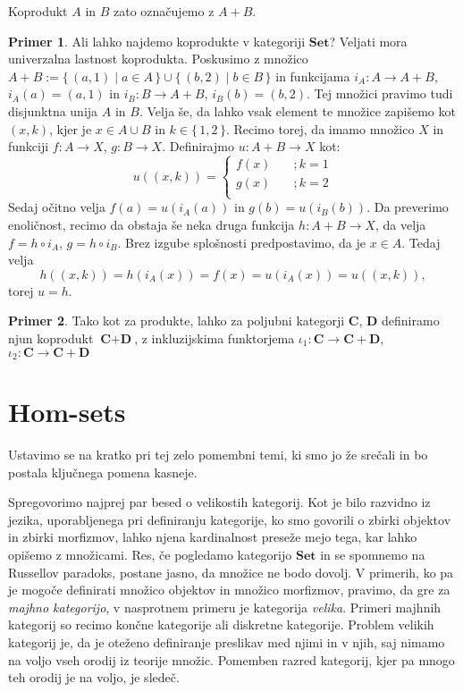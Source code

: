 \documentclass[12pt,a4paper]{book}
\theoremstyle{definition}
\theoremstyle{plain}
\theoremstyle{definition}
\newtheorem{primer}{Primer}[section]
\theoremstyle{remark}
\newcommand{\cat}[1]{\textbf{#1}}
\renewcommand{\set}[1]{\{\,#1\,\}}
\begin{document}
Koprodukt $A$ in $B$ zato označujemo z $A + B$.
\begin{primer}
Ali lahko najdemo koprodukte v kategoriji $\cat{Set}$? 
Veljati mora univerzalna lastnost koprodukta.
Poskusimo z množico $A+B := \set{(a,1) \mid a \in A} \cup \set{(b,2) \mid b \in B}$ in funkcijama $i_A : A \to A + B$, $i_A(a) = (a,1)$ in $i_B : B \to A+B$, $i_B(b) = (b,2)$. Tej množici pravimo tudi disjunktna unija $A$ in $B$. Velja še, da lahko vsak element te množice zapišemo kot $(x,k)$, kjer je $x \in A \cup B$ in $k \in \set{1,2}$. Recimo torej, da imamo množico $X$ in funkciji $f : A \to X$, $g: B \to X$. Definirajmo $u: A+B \to X$ kot:
\[
u((x,k)) = 
	\begin{cases}
		f(x) &\quad ;k = 1 \\
		g(x) &\quad ;k = 2 \\
	\end{cases}
\]
Sedaj očitno velja $f(a) = u(i_A(a))$ in $g(b) = u(i_B(b))$. Da preverimo enoličnost, recimo da obstaja še neka druga funkcija $h : A+B \to X$, da velja $f = h \circ i_A$, $g = h \circ i_B$. Brez izgube splošnosti predpostavimo, da je $x \in A$. Tedaj velja
$$h((x,k)) = h(i_A(x)) = f(x) = u(i_A(x)) = u((x,k)),$$
torej $u = h$.
\end{primer}

\begin{primer}
Tako kot za produkte, lahko za poljubni kategorji $\cat{C}$, $\cat{D}$ definiramo njun koprodukt $\cat{C} + \cat{D}$, z inkluzijskima funktorjema $\iota_1 : \cat{C} \to \cat{C} + \cat{D}$, $\iota_2 : \cat{C} \to \cat{C} + \cat{D}$
\end{primer}

\section{Hom-sets}
Ustavimo se na kratko pri tej zelo pomembni temi, ki smo jo že srečali in bo postala ključnega pomena kasneje.


Spregovorimo najprej par besed o velikostih kategorij. Kot je bilo razvidno iz jezika, uporabljenega pri definiranju kategorije, ko smo govorili o zbirki objektov in zbirki morfizmov, lahko njena kardinalnost preseže mejo tega, kar lahko opišemo z množicami. Res, če pogledamo kategorijo $\cat{Set}$ in se spomnemo na Russellov paradoks, postane jasno, da množice ne bodo dovolj. V primerih, ko pa je mogoče definirati množico objektov in množico morfizmov, pravimo, da gre za \emph{majhno kategorijo}, v nasprotnem primeru je kategorija \emph{velika}. Primeri majhnih kategorij so recimo končne kategorije ali diskretne kategorije. Problem velikih kategorij je, da je oteženo definiranje preslikav med njimi in v njih, saj nimamo na voljo vseh orodij iz teorije množic. Pomemben razred kategorij, kjer pa mnogo teh orodij je na voljo, je sledeč.
\end{document}
